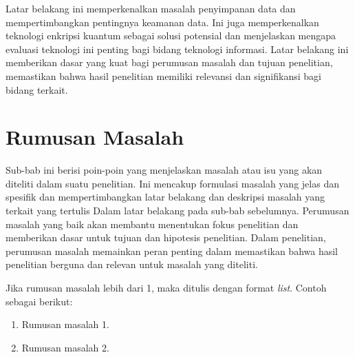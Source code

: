 \vspace{5mm}
Latar belakang ini memperkenalkan masalah penyimpanan data dan mempertimbangkan pentingnya keamanan data. Ini juga memperkenalkan teknologi enkripsi kuantum sebagai solusi potensial dan menjelaskan mengapa evaluasi teknologi ini penting bagi bidang teknologi informasi. Latar belakang ini memberikan dasar yang kuat bagi perumusan masalah dan tujuan penelitian, memastikan bahwa hasil penelitian memiliki relevansi dan signifikansi bagi bidang terkait.

\section{Rumusan Masalah}

Sub-bab ini berisi poin-poin yang menjelaskan masalah atau isu yang akan diteliti dalam suatu penelitian. Ini mencakup formulasi masalah yang jelas dan spesifik dan 
mempertimbangkan latar belakang dan deskripsi masalah yang terkait yang tertulis Dalam latar belakang pada sub-bab sebelumnya. Perumusan masalah yang baik akan membantu menentukan fokus penelitian dan memberikan dasar untuk tujuan dan hipotesis penelitian. Dalam penelitian, perumusan masalah memainkan peran penting dalam memastikan bahwa hasil penelitian berguna dan relevan untuk masalah yang diteliti.

Jika rumusan masalah lebih dari 1, maka ditulis dengan format \textit{list}. Contoh sebagai  berikut:

\begin{enumerate}
	\item Rumusan masalah 1.
	\item Rumusan masalah 2.
\end{enumerate}

\noindent{}

